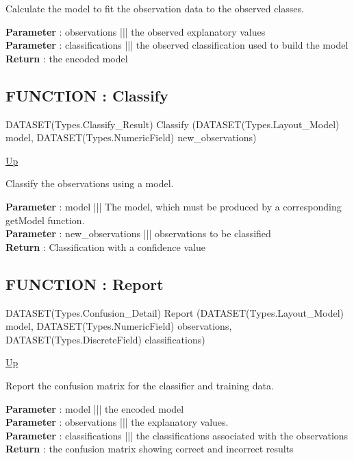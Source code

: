 \par
Calculate the model to fit the observation data to the observed classes.
\par
\textbf{Parameter} : observations ||| the observed explanatory values \\
\textbf{Parameter} : classifications ||| the observed classification used to build the model \\
\textbf{Return} : the encoded model \\
\subsection*{FUNCTION : Classify}
\hypertarget{ecldoc:ml_core.interfaces.iclassify.classify}{}
\begin{minipage}[t]{\textwidth}
\begin{flushleft}
DATASET(Types.Classify\_Result) Classify (DATASET(Types.Layout\_Model) model, DATASET(Types.NumericField) new\_observations)
\end{flushleft}
\end{minipage}
\hyperlink{ecldoc:ML_Core.Interfaces.IClassify}{Up}

\par
Classify the observations using a model.
\par
\textbf{Parameter} : model ||| The model, which must be produced by a corresponding getModel function. \\
\textbf{Parameter} : new\_observations ||| observations to be classified \\
\textbf{Return} : Classification with a confidence value \\
\subsection*{FUNCTION : Report}
\hypertarget{ecldoc:ml_core.interfaces.iclassify.report}{}
\begin{minipage}[t]{\textwidth}
\begin{flushleft}
DATASET(Types.Confusion\_Detail) Report (DATASET(Types.Layout\_Model) model, DATASET(Types.NumericField) observations, DATASET(Types.DiscreteField) classifications)
\end{flushleft}
\end{minipage}
\hyperlink{ecldoc:ML_Core.Interfaces.IClassify}{Up}

\par
Report the confusion matrix for the classifier and training data.
\par
\textbf{Parameter} : model ||| the encoded model \\
\textbf{Parameter} : observations ||| the explanatory values. \\
\textbf{Parameter} : classifications ||| the classifications associated with the observations \\
\textbf{Return} : the confusion matrix showing correct and incorrect results \\

